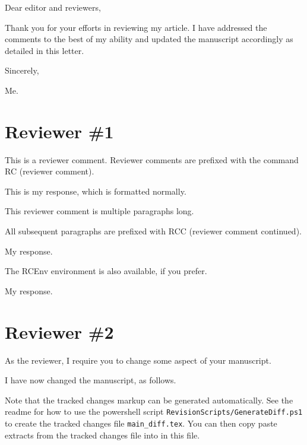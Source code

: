 \documentclass{AuthorResponse}
\newcommand{\arMatchCitationNumbers}{}
\begin{document}
\pagestyle{arPageStyle}
\thispagestyle{arPageStyleFirst}
\arLegend
\arMatchCitationNumbers

Dear editor and reviewers,

Thank you for your efforts in reviewing my article. I have addressed the comments to the best of my ability and updated the manuscript accordingly as detailed in this letter.

Sincerely,

Me.

\section{Reviewer \#1}
\RC This is a reviewer comment. Reviewer comments are prefixed with the command RC (reviewer comment). 

This is my response, which is formatted normally.

\RC This reviewer comment is multiple paragraphs long.

\RCC All subsequent paragraphs are prefixed with RCC (reviewer comment continued). 

My response.


\begin{RCEnv}
	The RCEnv environment is also available, if you prefer.
\end{RCEnv}

My response.


\section{Reviewer \#2}
\RC As the reviewer, I require you to change some aspect of your manuscript.

I have now changed the manuscript, as follows.

Note that the tracked changes markup can be generated automatically. See the readme for how to use the powershell script \verb|RevisionScripts/GenerateDiff.ps1| to create the tracked changes file \verb|main_diff.tex|. You can then copy paste extracts from the tracked changes file into in this file.
\end{document}
